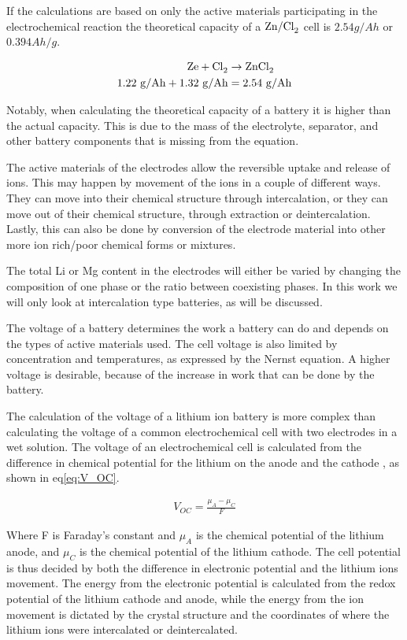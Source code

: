 	If the calculations are based on only the active materials participating in the electrochemical reaction the theoretical capacity of a $\ce{Zn/Cl_2}$ cell is $2.54\text{} \si{g/Ah}$ or $0.394\text{} \si{Ah/g}$.
	

	\begin{align}
	\ce{Ze} + \ce{Cl_2} &\rightarrow \ce{ZnCl_2}\\
	1.22\text{ } \si{g/Ah} + 1.32\text{ } \si{g/Ah} &= 2.54\text{ } \si{g/Ah}
	\end{align}
	
	Notably, when calculating the theoretical capacity of a battery it is higher than the actual capacity. This is due to the mass of the electrolyte, separator, and other battery components that is missing from the equation.
	
	The active materials of the electrodes allow the reversible uptake and release of ions. This may happen by movement of the ions in a couple of different ways. They can move into their chemical structure through intercalation, or they can move out of their chemical structure, through extraction or deintercalation. Lastly, this can also be done by conversion of the electrode material into other more ion rich/poor chemical forms or mixtures. 
	
	The total Li or Mg content in the electrodes will either be varied by changing the composition of one phase or the ratio between coexisting phases. In this work we will only look at intercalation type batteries, as will be discussed. 
		
The voltage of a battery determines the work a battery can do and depends on the types of active materials used. The cell voltage is also limited by concentration and temperatures, as expressed by the Nernst equation. A higher voltage is desirable, because of the increase in work that can be done by the battery.

The calculation of the voltage of a lithium ion battery is more complex than calculating the voltage of a common electrochemical cell with two electrodes in a wet solution. The voltage of an electrochemical cell is calculated from the difference in chemical potential for the lithium on the anode and the cathode \cite{aydinol1997first}, as shown in eq\ref{eq:V_OC}.

\begin{align}\label{eq:V_OC}
V_{OC} = \frac{\mu_A - \mu_C}{F}
\end{align}

Where F is Faraday's constant and $\mu_A$ is the chemical potential of the lithium anode, and $\mu_C$ is the chemical potential of the lithium cathode. The cell potential is thus decided by both the difference in electronic potential and the lithium ions movement. The energy from the electronic potential is calculated from the redox potential of the lithium cathode and anode, while the energy from the ion movement is dictated by the crystal structure and the coordinates of where the lithium ions were intercalated or deintercalated.  

